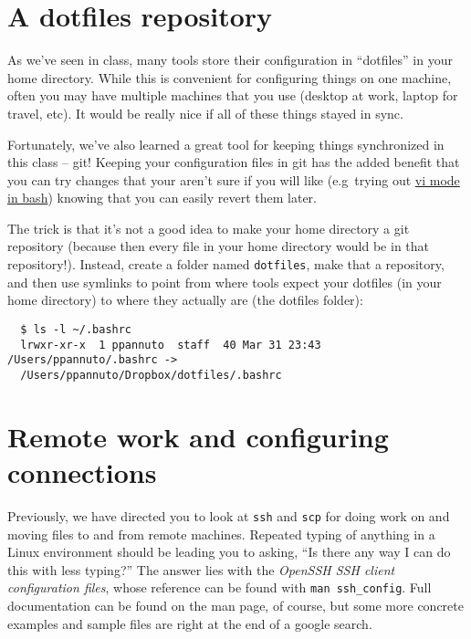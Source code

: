 \documentclass{article}
\begin{document}


\section{A dotfiles repository}

As we've seen in class, many tools store their configuration in ``dotfiles''
in your home directory. While this is convenient for configuring things on one
machine, often you may have multiple machines that you use (desktop at
work, laptop for travel, etc). It would be really nice if all of these things
stayed in sync.

Fortunately, we've also learned a great tool for keeping things synchronized
in this class -- git! Keeping your configuration files in git has the added
benefit that you can try changes that your aren't sure if you will like
(e.g\ trying out \href{http://blog.sanctum.geek.nz/vi-mode-in-bash/}{vi mode
in bash}) knowing that you can easily revert them later.

The trick is that it's not a good idea to make your home directory a git
repository (because then every file in your home directory would be in that
repository!). Instead, create a folder named \texttt{dotfiles}, make that a
repository, and then use symlinks to point from where tools expect your
dotfiles (in your home directory) to where they actually are (the dotfiles
folder):

\begin{lstlisting}
  $ ls -l ~/.bashrc
  lrwxr-xr-x  1 ppannuto  staff  40 Mar 31 23:43 /Users/ppannuto/.bashrc ->
  /Users/ppannuto/Dropbox/dotfiles/.bashrc
\end{lstlisting}


\section{Remote work and configuring connections}
Previously, we have directed you to look at \texttt{ssh} and \texttt{scp}
for doing work on and moving files to and from remote machines. Repeated
typing of anything in a Linux environment should be leading you to asking,
``Is there any way I can do this with less typing?'' The answer lies with the
\emph{OpenSSH SSH client configuration files}, whose reference can be found
with \texttt{man ssh\_config}. Full documentation can be found on the man
page, of course, but some more concrete examples and sample files are right
at the end of a google search.
\end{document}
